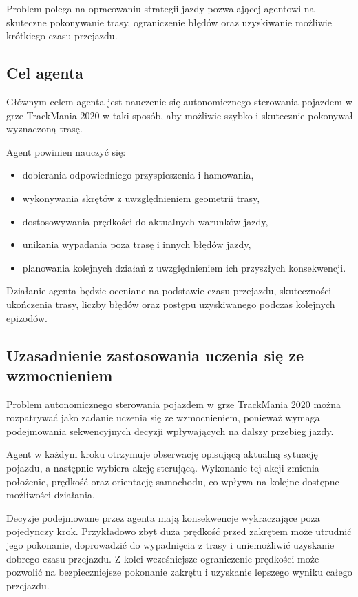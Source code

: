 \documentclass[12pt]{article}
\begin{document}
Problem polega na opracowaniu strategii jazdy pozwalającej agentowi na skuteczne pokonywanie trasy, ograniczenie błędów oraz uzyskiwanie możliwie krótkiego czasu przejazdu.

\subsection{Cel agenta}

Głównym celem agenta jest nauczenie się autonomicznego sterowania pojazdem w grze TrackMania 2020 w taki sposób, aby możliwie szybko i skutecznie pokonywał wyznaczoną trasę.

Agent powinien nauczyć się:
\begin{itemize}
    \item dobierania odpowiedniego przyspieszenia i hamowania,
    \item wykonywania skrętów z uwzględnieniem geometrii trasy,
    \item dostosowywania prędkości do aktualnych warunków jazdy,
    \item unikania wypadania poza trasę i innych błędów jazdy,
    \item planowania kolejnych działań z uwzględnieniem ich przyszłych konsekwencji.
\end{itemize}

Działanie agenta będzie oceniane na podstawie czasu przejazdu, skuteczności ukończenia trasy, liczby błędów oraz postępu uzyskiwanego podczas kolejnych epizodów.

\subsection{Uzasadnienie zastosowania uczenia się ze wzmocnieniem}

Problem autonomicznego sterowania pojazdem w grze TrackMania 2020 można rozpatrywać jako zadanie uczenia się ze wzmocnieniem, ponieważ wymaga podejmowania sekwencyjnych decyzji wpływających na dalszy przebieg jazdy.

Agent w każdym kroku otrzymuje obserwację opisującą aktualną sytuację pojazdu, a następnie wybiera akcję sterującą. Wykonanie tej akcji zmienia położenie, prędkość oraz orientację samochodu, co wpływa na kolejne dostępne możliwości działania.

Decyzje podejmowane przez agenta mają konsekwencje wykraczające poza pojedynczy krok. Przykładowo zbyt duża prędkość przed zakrętem może utrudnić jego pokonanie, doprowadzić do wypadnięcia z trasy i uniemożliwić uzyskanie dobrego czasu przejazdu. Z kolei wcześniejsze ograniczenie prędkości może pozwolić na bezpieczniejsze pokonanie zakrętu i uzyskanie lepszego wyniku całego przejazdu.
\end{document}
